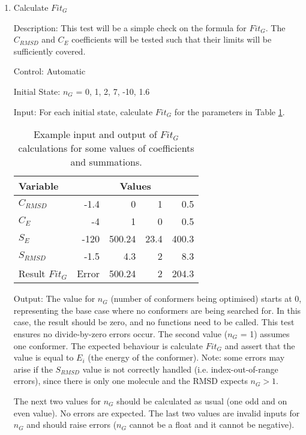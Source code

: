 \documentclass[12pt, titlepage]{article}
\begin{document}
\begin{enumerate}
	
	\item Calculate $Fit_G$
	
	Description: This test will be a simple check on the formula for $Fit_G$. 
	The $C_{RMSD}$ and $C_E$ coefficients will be tested such that their limits 
	will be sufficiently covered.
	
	Control: Automatic
	
	Initial State: $n_G$ = 0, 1, 2, 7, -10, 1.6
	
	Input: For each initial state, calculate $Fit_G$ for the parameters in 
	Table \ref{table-fitg}.

	\begin{table}[H]
		\begin{center}
		\begin{tabular}{lrrrr}
			\toprule
			Variable & \multicolumn{4}{c}{Values} \\
			\midrule
			$C_{RMSD}$ 	   & -1.4  & 0      & 1    & 0.5   \\
			$C_E$		   & -4    & 1      & 0    & 0.5   \\
			$S_E$ 		   & -120  & 500.24 & 23.4 & 400.3 \\
			$S_{RMSD}$ 	   & -1.5  & 4.3    & 2    & 8.3   \\
			\midrule
			Result $Fit_G$ & Error & 500.24 & 2    & 204.3 \\
			\bottomrule
		\end{tabular}
		\end{center}
	\caption{Example input and output of $Fit_G$ calculations for some values 
	of coefficients and summations.}
	\label{table-fitg}
	\end{table}
	
	Output: The value for $n_G$ (number of conformers being optimised) 
	starts at 0, representing the base case where no conformers are being 
	searched for. In this case, the result should be zero, and no functions 
	need to be called. This test ensures no divide-by-zero errors occur. The 
	second value ($n_G$ = 1) assumes one conformer. The expected behaviour is 
	calculate $Fit_G$ and assert that the value is equal to $E_i$ (the energy 
	of the conformer). Note: some errors may arise if the $S_{RMSD}$ value is 
	not correctly handled (i.e. index-out-of-range errors), since there is only 
	one molecule and the RMSD expects $n_G > 1$.
	
	The next two values for $n_G$ should be calculated as usual (one odd and on 
	even value). No errors are expected. The last two values are invalid inputs 
	for $n_G$ and should raise errors ($n_G$ cannot be a float and it cannot be 
	negative).
	

\end{enumerate}
\end{document}
